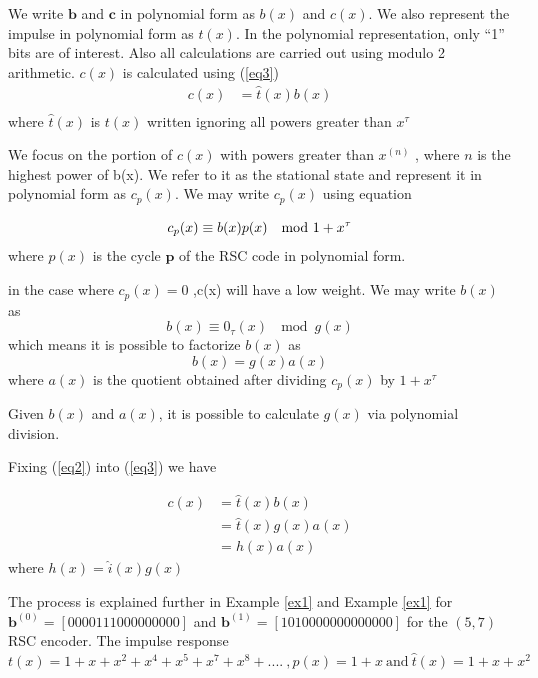 \documentclass[twocolumn]{article}
\begin{document}
 We write $\textbf{b}$ and $\textbf{c}$ in polynomial form as $b(x)$ and $c(x)$. We also represent the impulse in polynomial form as $t(x)$. In the polynomial representation, only ``1'' bits are of interest. Also all calculations are carried out using modulo 2 arithmetic.
$c(x)$ is calculated using (\ref{eq3})
 \begin{equation}
 \begin{split}
 c(x)&=\hat{t}(x)b(x)\\
 \end{split}
 \label{eq3}
 \end{equation}
 where $\hat{t}(x)$ is $t(x)$ written ignoring all powers greater than $x^{\tau}$
 
 We focus on the portion of $c(x)$ with powers greater than $x^{(n)}$ , where $n$ is the highest power of b(x). We refer to it as the stational state and represent it in polynomial form as $c_p(x)$.  We may write $c_p(x)$ using equation 

 \begin{equation}
 c_p(x)  \equiv b(x)p(x) ~\mod{ 1+ x^{\tau}}\\
 \label{eq1}
 \end{equation}
where $p(x)$ is the cycle $\textbf{p}$ of the  RSC code in polynomial form.
 
 in the case where $c_p(x) = 0$ ,c(x) will have a low weight.  We may write $b(x)$ as 
 $$b(x) \equiv  0_{\tau}(x) ~\mod{ g(x)} $$ which means  it is possible to factorize $b(x)$ as 
 \begin{equation}
 b(x) =g(x)a(x)
 \label{eq2}
 \end{equation}
 where $a(x)$ is the quotient obtained after dividing $c_p(x)$ by $1+ x^{\tau}$
 
 Given $b(x)$ and $a(x)$, it is possible to calculate $g(x)$ via polynomial division.
 
 Fixing (\ref{eq2}) into (\ref{eq3}) we have 
 
 \begin{equation}
 \begin{split}
 c(x)&=\hat{t}(x)b(x)\\
 &=\hat{t}(x)g(x)a(x)\\
 & = h(x)a(x)
 \end{split}
 \label{eq4}
 \end{equation}
 where  $h(x)=\hat{i}(x)g(x)$ 
 
 The process is explained further in Example  \ref{ex1}  and Example  \ref{ex1} for $\textbf{b}^{(0)}=[ 0 0 0 0 1 1 1 0 0 0 0 0 0 0 0 0]$ and  $\textbf{b}^{(1)}=[ 1 0 1 0 0 0 0 0 0 0 0 0 0 0 0 0 ]$ for the $(5,7)$ RSC encoder. The impulse response $t(x)=1+x+x^2+x^4+x^5+x^7+x^8+....~,p(x)=1+x ~ \text{and} ~ \hat{t}(x)=1+x+x^2$
 
\end{document}
